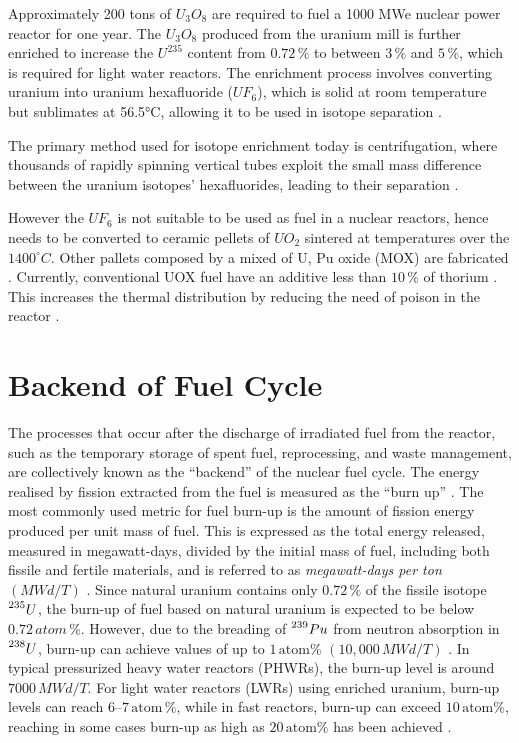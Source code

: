 Approximately 200 tons of \(U_3O_8\) are required to fuel a 1000 MWe nuclear power reactor for one year. The \(U_3O_8\) produced from the uranium mill is further enriched to increase the \(U^{235}\) content from \(0.72 \, \%\) to between \(3 \, \%\) and \(5 \, \%\), which is required for light water reactors. The enrichment process involves converting uranium into uranium hexafluoride (\(UF_6\)), which is solid at room temperature but sublimates at 56.5°C, allowing it to be used in isotope separation \cite{fuel_cycle_book}.

The primary method used for isotope enrichment today is centrifugation, where thousands of rapidly spinning vertical tubes exploit the small mass difference between the uranium isotopes' hexafluorides, leading to their separation \cite{fuel_cycle_book}.

However the \(UF_6\) is not suitable to be used as fuel in a nuclear reactors, hence needs to be converted to ceramic pellets of \(UO_2\) sintered at temperatures over the \(1400^{\circ}C\). Other pallets composed by a mixed of U, Pu oxide (MOX) are fabricated \cite{fuel_cycle_book}. Currently, conventional UOX fuel have an additive less than \(10 \, \%\) of thorium . This increases the thermal distribution by reducing the need of poison in the reactor \cite{Th_cycle_viability}.

\section{Backend of Fuel Cycle}

The processes that occur after the discharge of irradiated fuel from the reactor, such as the temporary storage of spent fuel, reprocessing, and waste management, are collectively known as the ``backend'' of the nuclear fuel cycle. The energy realised by fission extracted from the fuel is measured as the ``burn up'' \cite{fuel_cycle_book}. The most commonly used metric for fuel burn-up is the amount of fission energy produced per unit mass of fuel. This is expressed as the total energy released, measured in megawatt-days, divided by the initial mass of fuel, including both fissile and fertile materials, and is referred to as \textit{megawatt-days per ton} \((MWd/T)\) \cite{nuclear_reactors_adv}. Since natural uranium contains only \(0.72 \, \%\) of the fissile isotope \(\prescript{235}{}{U}\), the burn-up of fuel based on natural uranium is expected to be below \(0.72 \, atom \, \%\). However, due to the breading of \(\prescript{239}{}{Pu}\) from neutron absorption in \(\prescript{238}{}{U}\), burn-up can achieve values of up to \(1 \, \text{atom} \%\) \((10,000 \, MWd/T)\) \cite{fuel_cycle_book}. In typical pressurized heavy water reactors (PHWRs), the burn-up level is around \(7000 \, MWd/T\). For light water reactors (LWRs) using enriched uranium, burn-up levels can reach \(6–7 \, \text{atom} \, \%\), while in fast reactors, burn-up can exceed \(10 \, \text{atom} \%\), reaching in some cases burn-up as high as \(20 \, \text{atom} \%\) has been achieved \cite{fuel_cycle_book}.

